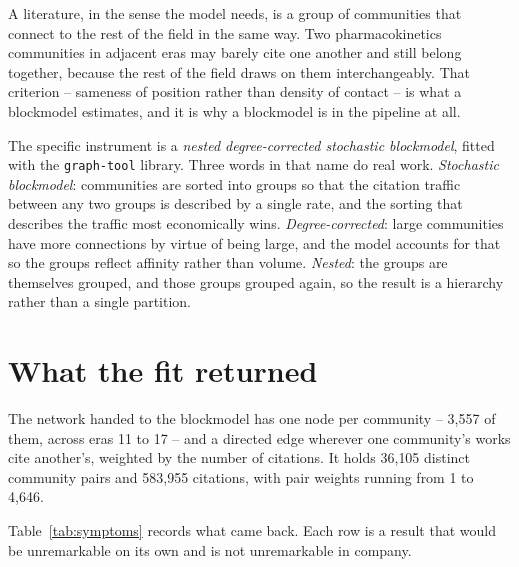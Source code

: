 \documentclass[11pt]{article}
\newcommand{\code}[1]{\texttt{\small #1}}
\begin{document}
A literature, in the sense the model needs, is a group of communities that
connect to the rest of the field in the same way. Two pharmacokinetics
communities in adjacent eras may barely cite one another and still belong
together, because the rest of the field draws on them interchangeably. That
criterion -- sameness of position rather than density of contact -- is what a
blockmodel estimates, and it is why a blockmodel is in the pipeline at all.

The specific instrument is a \emph{nested degree-corrected stochastic
blockmodel}, fitted with the \code{graph-tool} library. Three words in that name
do real work. \emph{Stochastic blockmodel}: communities are sorted into groups
so that the citation traffic between any two groups is described by a single
rate, and the sorting that describes the traffic most economically wins.
\emph{Degree-corrected}: large communities have more connections by virtue of
being large, and the model accounts for that so the groups reflect affinity
rather than volume. \emph{Nested}: the groups are themselves grouped, and those
groups grouped again, so the result is a hierarchy rather than a single
partition.

\section{What the fit returned}

The network handed to the blockmodel has one node per community -- 3{,}557 of
them, across eras 11 to 17 -- and a directed edge wherever one community's works
cite another's, weighted by the number of citations. It holds 36{,}105 distinct
community pairs and 583{,}955 citations, with pair weights running from 1 to
4{,}646.

Table~\ref{tab:symptoms} records what came back. Each row is a result that would
be unremarkable on its own and is not unremarkable in company.
\end{document}
